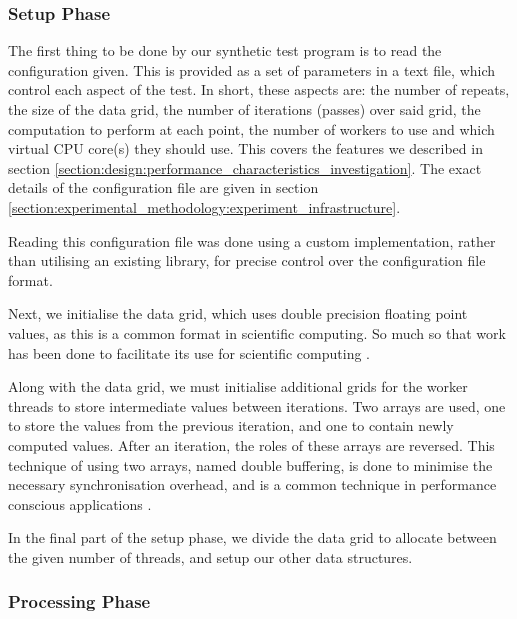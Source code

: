 \subsubsection{Setup Phase}
\label{section:implementation:setup_phase2}

The first thing to be done by our synthetic test program is to read the configuration given. This is provided as a set of parameters in a text file, which control each aspect of the test. In short, these aspects are: the number of repeats, the size of the data grid, the number of iterations (passes) over said grid, the computation to perform at each point, the number of workers to use and which virtual CPU core(s) they should use. This covers the features we described in section \ref{section:design:performance_characteristics_investigation}. The exact details of the configuration file are given in section \ref{section:experimental_methodology:experiment_infrastructure}.

Reading this configuration file was done using a custom implementation, rather than utilising an existing library, for precise control over the configuration file format.

Next, we initialise the data grid, which uses double precision floating point values, as this is a common format in scientific computing. So much so that work has been done to facilitate its use for scientific computing \cite{floating_point_example}.

Along with the data grid, we must initialise additional grids for the worker threads to store intermediate values between iterations. Two arrays are used, one to store the values from the previous iteration, and one to contain newly computed values. After an iteration, the roles of these arrays are reversed. This technique of using two arrays, named double buffering, is done to minimise the necessary synchronisation overhead, and is a common technique in performance conscious applications \cite{deng_wang_yan_yang_2008, sheeparamatti_sheeparamatti_bharamagoudar_ambali_2006}.

In the final part of the setup phase, we divide the data grid to allocate between the given number of threads, and setup our other data structures.



\subsubsection{Processing Phase}
\label{section:implementation:processing_phase2}

